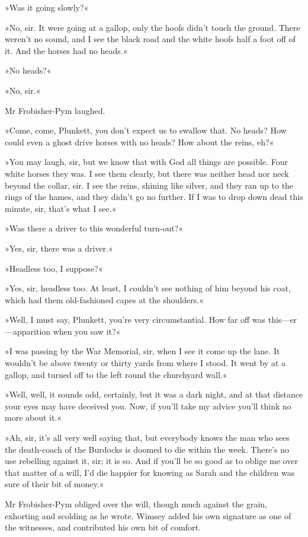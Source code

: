»Was it going slowly?«

»No, sir. It were going at a gallop, only the hoofs didn't touch the ground. There weren't no sound, and I see the black road and the white hoofs half a foot off of it. And the horses had no heads.«

»No heads?«

»No, sir.«

Mr Frobisher-Pym laughed.

»Come, come, Plunkett, you don't expect us to swallow that. No heads? How could even a ghost drive horses with no heads? How about the reins, eh?«

»You may laugh, sir, but we know that with God all things are possible. Four white horses they was. I see them clearly, but there was neither head nor neck beyond the collar, sir. I see the reins, shining like silver, and they ran up to the rings of the hames, and they didn't go no further. If I was to drop down dead this minute, sir, that's what I see.«

»Was there a driver to this wonderful turn-out?«

»Yes, sir, there was a driver.«

»Headless too, I suppose?«

»Yes, sir, headless too. At least, I couldn't see nothing of him beyond his coat, which had them old-fashioned capes at the shoulders.«

»Well, I must say, Plunkett, you're very circumstantial. How far off was this—er—apparition when you saw it?«

»I was passing by the War Memorial, sir, when I see it come up the lane. It wouldn't be above twenty or thirty yards from where I stood. It went by at a gallop, and turned off to the left round the churchyard wall.«

»Well, well, it sounds odd, certainly, but it was a dark night, and at that distance your eyes may have deceived you. Now, if you'll take my advice you'll think no more about it.«

»Ah, sir, it's all very well saying that, but everybody knows the man who sees the death-coach of the Burdocks is doomed to die within the week. There's no use rebelling against it, sir; it is so. And if you'll be so good as to oblige me over that matter of a will, I'd die happier for knowing as Sarah and the children was sure of their bit of money.«

Mr Frobisher-Pym obliged over the will, though much against the grain, exhorting and scolding as he wrote. Wimsey added his own signature as one of the witnesses, and contributed his own bit of comfort.

